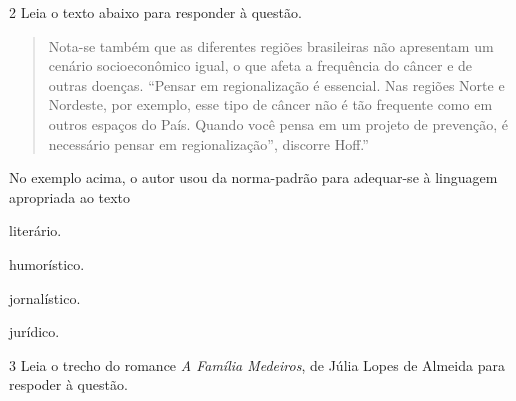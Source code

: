 \num{2} Leia o texto abaixo para responder à questão.

\begin{quote}
Nota-se também que as diferentes regiões brasileiras não apresentam um
cenário socioeconômico igual, o que afeta a frequência do câncer e de
outras doenças. ``Pensar em regionalização é essencial. Nas regiões Norte
e Nordeste, por exemplo, esse tipo de câncer não é tão frequente como em
outros espaços do País. Quando você pensa em um projeto de prevenção, é
necessário pensar em regionalização'', discorre Hoff.''
\end{quote}


No exemplo acima, o autor usou da norma-padrão para adequar-se à linguagem apropriada ao texto

\begin{escolha}
  
  \item literário.
  
  \item humorístico.
  
  \item jornalístico.
  
  \item jurídico.

\end{escolha}


\num{3} Leia o trecho do romance \textit{A Família Medeiros}, de Júlia Lopes de Almeida para 
respoder à questão. 

